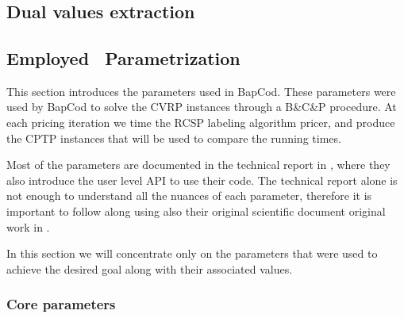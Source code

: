 \chapter{\bapcod}
\label{sec:bapcod-appendix}


%
%
%

\section{Dual values extraction}


\section{Employed \bapcod\ Parametrization}
\label{sec:employed-bapcod-parametrization}

This section introduces the parameters used in BapCod.
These parameters were used by BapCod to solve the CVRP instances through a B\&C\&P procedure.
At each pricing iteration we time the RCSP labeling algorithm pricer, and produce the CPTP instances that will be used to compare the running times.

Most of the parameters are documented in the technical report in \cite{sadykov2021}, where they also introduce the user level API to use their code.
The technical report alone is not enough to understand all the nuances of each parameter, therefore it is important to follow along using also their original scientific document original work in \cite{pessoa2020}.

In this section we will concentrate only on the parameters that were used to achieve the desired goal along with their associated values.

\subsection{Core parameters}

